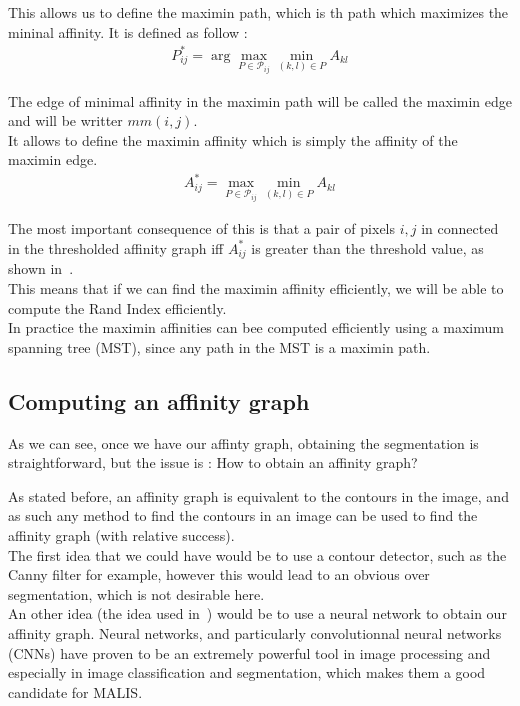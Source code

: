 This allows us to define the maximin path, which is th path which maximizes the
mininal affinity. It is defined as follow :
\begin{gather*}
	P^*_{ij} =\arg \max_{P\in\mathcal{P}_{ij}}\min_{(k,l)\in P} A_{kl}
\end{gather*}

The edge of minimal affinity in the maximin path will be called the maximin
edge and will be writter $mm(i,j)$.\\
It allows to define the maximin affinity which is simply the affinity of the
maximin edge.
\begin{gather*}
	A^*_{ij} = \max_{P\in\mathcal{P}_{ij}}\min_{(k,l)\in P} A_{kl}
\end{gather*}

The most important consequence of this is that a pair of pixels $i,j$ in connected in
the thresholded affinity graph iff $A^*_{ij}$ is greater than the threshold
value, as shown in~\cite{turaga_maximin_2009}.\\

This means that if we can find the maximin affinity efficiently, we will be
able to compute the Rand Index efficiently.\\
In practice the maximin affinities can bee computed efficiently using a maximum
spanning tree (MST), since any path in the MST is a maximin path.

\subsection{Computing an affinity graph}
As we can see, once we have our affinty graph, obtaining the segmentation is
straightforward, but the issue is : How to obtain an affinity graph? 

As stated before, an affinity graph is equivalent to the contours in the image,
and as such any method to find the contours in an image can be used to find the
affinity graph (with relative success).\\
The first idea that we could have would be to use a contour detector, such as
the Canny filter for example, however this would lead to an obvious over
segmentation, which is not desirable here.\\

An other idea (the idea used in~\cite{turaga_maximin_2009}) would be to use a
neural network to obtain our affinity graph. Neural networks, and particularly
convolutionnal neural networks (CNNs) have proven to be an extremely powerful
tool in image processing and especially in image classification and
segmentation, which makes them a good candidate for MALIS.\\

